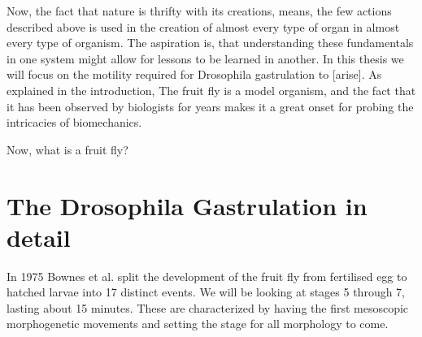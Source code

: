 Now, the fact that nature is thrifty with its creations, means, the few actions described above is used in the creation of almost every type of organ in almost every type of organism. The aspiration is, that understanding these fundamentals in one system might allow for lessons to be learned in another. In this thesis we will focus on the motility required for Drosophila gastrulation to [arise]. As explained in the introduction, The fruit fly is a model organism, and the fact that it has been observed by biologists for years makes it a great onset for probing the intricacies of biomechanics.


Now, what is a fruit fly? 






\newpage
\section{The Drosophila Gastrulation in detail}
In 1975 Bownes et al. split the development of the fruit fly from fertilised egg to hatched larvae into 17 distinct events.\cite{bownes1975photographic} We will be looking at stages 5 through 7, lasting about 15 minutes. These are characterized by having the first mesoscopic morphogenetic movements and setting the stage for all morphology to come.


